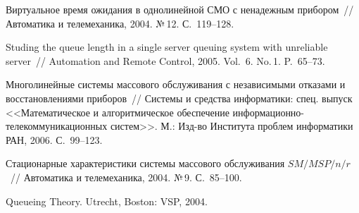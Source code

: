 \begin{multicols}{2}
{{\begin{thebibliography}{99}
Виртуальное время ожидания в однолинейной СМО с ненадежным прибором~//
Автоматика и телемеханика, 2004. №\,12. С.~119--128.

Studing the queue length in a single server queuing system with unreliable
server~//
Automation and Remote Control, 2005. Vol.~6. No.\,1. P.~65--73.

Многолинейные системы массового обслуживания с независимыми
отказами и восстановлениями приборов~// Системы и средства информатики:
спец. выпуск <<Математическое и алгоритмическое обеспечение
информационно-телекоммуникационных систем>>.
М.: Изд-во Института проблем информатики РАН, 2006. С.~99--123.

Стационарные характеристики системы массового обслуживания $SM/MSP/n/r$~//
Автоматика и телемеханика, 2004. №\,9. С.~85--100.

Queueing Theory. Utrecht, Boston: VSP, 2004.

\end{thebibliography}

}
}


\end{multicols}

\label{end\stat}